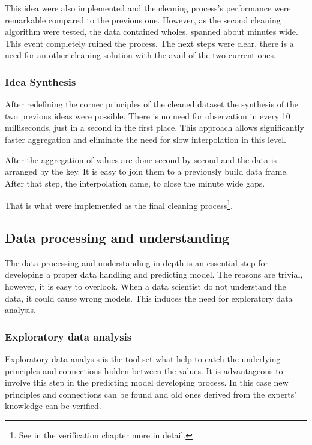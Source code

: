 		This idea were also implemented and the cleaning process's performance were remarkable compared to the previous one. However, as the second cleaning algorithm were tested, the data contained wholes, spanned about minutes wide. This event completely ruined the process. The next steps were clear, there is a need for an other cleaning solution with the avail of the two current ones.
\clearpage\subsubsection{Idea Synthesis}
		After redefining the corner principles of the cleaned dataset the synthesis of the two previous ideas were possible.
		There is no need for observation in every 10 milliseconds, just in a second in the first place. This approach allows significantly faster aggregation and eliminate the need for slow interpolation in this level.

		After the aggregation of values are done second by second and the data is arranged by the key. It is easy to join them to a previously build data frame. After that step, the interpolation came, to close the minute wide gaps.

		That is what were implemented as the final cleaning process\footnote{See in the verification chapter more in detail.}.
\subsection{Data processing and understanding}
		The data processing and understanding in depth is an essential step for developing a proper data handling and predicting model.
		The reasons are trivial, however, it is easy to overlook. When a data scientist do not understand the data, it could cause wrong models. This induces the need for exploratory data analysis.
	\subsubsection{Exploratory data analysis}
		Exploratory data analysis is the tool set what help to catch the underlying principles and connections hidden between the values. It is advantageous to involve this step in the predicting model developing process. In this case new principles and connections can be found and old ones derived from the experts' knowledge can be verified.
